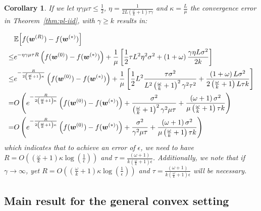 \documentclass[twoside]{article}
\newtheorem{corollary}{Corollary}
\begin{document}
\begin{corollary}
If we  let $\eta\gamma\mu\tau\leq\frac{1}{2}$, $\eta=\frac{1}{2L\left(\frac{\omega}{k}+1\right)\tau\gamma }$ and $\kappa=\frac{L}{\mu}$ the convergence error in Theorem~\ref{thm:pl-iid}, with $\gamma\geq k$ results in:

\begin{align}\notag
&\mathbb{E}\Big[f({\boldsymbol{w}}^{(R)})-f({\boldsymbol{w}}^{(*)})\Big]\nonumber\\
\leq& e^{-\eta\gamma{\mu\tau}R}\left(f(\boldsymbol{w}^{(0)})-f(\boldsymbol{w}^{(*)})\right)+\frac{1}{{\mu}}\left[\frac{1}{2} \tau L^2\eta^2\sigma^2+\left(1+\omega\right)\frac{\gamma\eta L\sigma^2}{2k}\right]\nonumber\\
\leq& e^{-\frac{R}{2\left(\frac{\omega}{k}+1\right)\kappa}}\left(f(\boldsymbol{w}^{(0)})-f(\boldsymbol{w}^{(*)})\right)+\frac{1}{{\mu}}\left[\frac{1}{2} L^2\frac{\tau\sigma^2}{L^2\left(\frac{\omega}{k}+1\right)^2\gamma^2\tau^2}+\frac{\left(1+\omega\right) L\sigma^2}{2\left(\frac{\omega}{k}+1\right)L\tau k}\right]\nonumber\\
=&O\left(e^{-\frac{R}{2\left(\frac{\omega}{k}+1\right)\kappa}}\left(f(\boldsymbol{w}^{(0)})-f(\boldsymbol{w}^{(*)})\right)+\frac{\sigma^2}{\left(\frac{\omega}{k}+1\right)^2\gamma^2\mu\tau}+\frac{\left(\omega+1\right)\sigma^2}{\mu\left(\frac{\omega}{k}+1\right) \tau k}\right)
\nonumber\\
=&O\left(e^{-\frac{R}{2\left(\frac{\omega}{k}+1\right)\kappa}}\left(f(\boldsymbol{w}^{(0)})-f(\boldsymbol{w}^{(*)})\right)+\frac{\sigma^2}{\gamma^2\mu\tau}+\frac{\left(\omega+1\right)\sigma^2}{\mu\left(\frac{\omega}{k}+1\right) \tau k}\right)
\end{align}
which indicates  that to achieve an error of $\epsilon$, we need to have $R=O\left(\left(\frac{\omega}{k}+1\right)\kappa\log\left(\frac{1}{\epsilon}\right)\right)$ and $\tau=\frac{\left(\omega+1\right)}{k\left(\frac{\omega}{k}+1\right)\epsilon}$. {Additionally, we note that if $\gamma\rightarrow\infty$, yet $R=O\left(\left(\frac{\omega}{k}+1\right)\kappa\log\left(\frac{1}{\epsilon}\right)\right)$ and $\tau=\frac{\left(\omega+1\right)}{k\left(\frac{\omega}{k}+1\right)\epsilon}$ will be necessary.}
\end{corollary}

\newpage
\subsection{Main result for the general convex setting}
\end{document}
